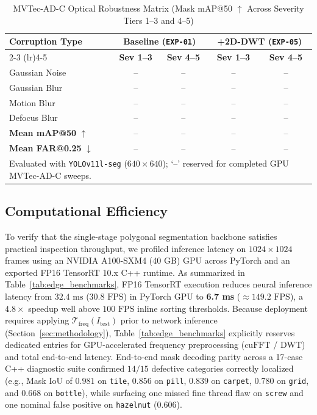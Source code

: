 \begin{table}[t]
\centering
\caption{MVTec-AD-C Optical Robustness Matrix (Mask mAP@50 $\uparrow$ Across Severity Tiers 1--3 and 4--5)}
\label{tab:corruption_table}
\setlength{\tabcolsep}{4pt}
\begin{tabular}{l c c c c}
\toprule
\multirow{2}{*}{\textbf{Corruption Type}} & \multicolumn{2}{c}{\textbf{Baseline (\texttt{EXP-01})}} & \multicolumn{2}{c}{\textbf{+2D-DWT (\texttt{EXP-05})}} \\
\cmidrule(lr){2-3} \cmidrule(lr){4-5}
 & \textbf{Sev 1--3} & \textbf{Sev 4--5} & \textbf{Sev 1--3} & \textbf{Sev 4--5} \\
\midrule
Gaussian Noise & -- & -- & -- & -- \\
Gaussian Blur  & -- & -- & -- & -- \\
Motion Blur    & -- & -- & -- & -- \\
Defocus Blur   & -- & -- & -- & -- \\
\midrule
\textbf{Mean mAP@50} $\uparrow$ & -- & -- & -- & -- \\
\textbf{Mean FAR@0.25} $\downarrow$ & -- & -- & -- & -- \\
\bottomrule
\multicolumn{5}{p{0.94\columnwidth}}{\footnotesize Evaluated with \texttt{YOLOv11l-seg} ($640\times 640$); `--' reserved for completed GPU MVTec-AD-C sweeps.}
\end{tabular}
\end{table}

\subsection{Computational Efficiency}
\label{subsec:efficiency}
To verify that the single-stage polygonal segmentation backbone satisfies practical inspection throughput, we profiled inference latency on $1024 \times 1024$ frames using an NVIDIA A100-SXM4 (40 GB) GPU across PyTorch and an exported FP16 TensorRT 10.x C++ runtime. As summarized in Table~\ref{tab:edge_benchmarks}, FP16 TensorRT execution reduces neural inference latency from $32.4\text{ ms}$ ($30.8\text{ FPS}$) in PyTorch GPU to \textbf{6.7 ms} ($\approx 149.2\text{ FPS}$), a $4.8\times$ speedup well above $100\text{ FPS}$ inline sorting thresholds. Because deployment requires applying $\mathcal{T}_{\text{freq}}(I_{\text{test}})$ prior to network inference (Section~\ref{sec:methodology}), Table~\ref{tab:edge_benchmarks} explicitly reserves dedicated entries for GPU-accelerated frequency preprocessing ($\text{cuFFT}$ / $\text{DWT}$) and total end-to-end latency. End-to-end mask decoding parity across a 17-case C++ diagnostic suite confirmed $14/15$ defective categories correctly localized (e.g., Mask IoU of $0.981$ on \texttt{tile}, $0.856$ on \texttt{pill}, $0.839$ on \texttt{carpet}, $0.780$ on \texttt{grid}, and $0.668$ on \texttt{bottle}), while surfacing one missed fine thread flaw on \texttt{screw} and one nominal false positive on \texttt{hazelnut} ($0.606$).

